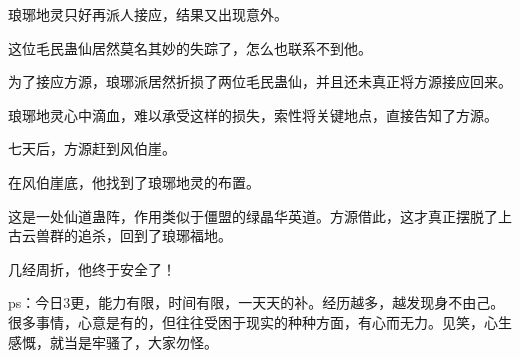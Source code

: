 \begin{this_body}
琅琊地灵只好再派人接应，结果又出现意外。

这位毛民蛊仙居然莫名其妙的失踪了，怎么也联系不到他。

为了接应方源，琅琊派居然折损了两位毛民蛊仙，并且还未真正将方源接应回来。

琅琊地灵心中滴血，难以承受这样的损失，索性将关键地点，直接告知了方源。

七天后，方源赶到风伯崖。

在风伯崖底，他找到了琅琊地灵的布置。

这是一处仙道蛊阵，作用类似于僵盟的绿晶华英道。方源借此，这才真正摆脱了上古云兽群的追杀，回到了琅琊福地。

几经周折，他终于安全了！

ps：今日3更，能力有限，时间有限，一天天的补。经历越多，越发现身不由己。很多事情，心意是有的，但往往受困于现实的种种方面，有心而无力。见笑，心生感慨，就当是牢骚了，大家勿怪。

\end{this_body}

